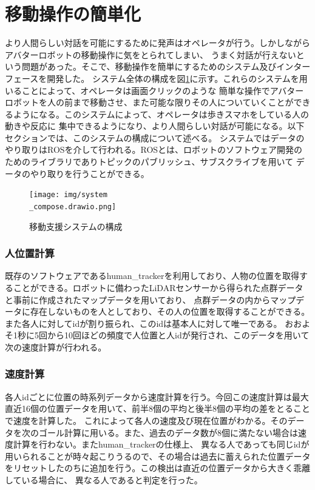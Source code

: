 \documentclass{kuisthesis}
\begin{document}
\section{移動操作の簡単化}
より人間らしい対話を可能にするために発声はオペレータが行う。しかしながらアバターロボットの移動操作に気をとられてしまい、
うまく対話が行えないという問題があった。そこで、移動操作を簡単にするためのシステム及びインターフェースを開発した。
システム全体の構成を図\ref{pic:systemcompose}に示す。これらのシステムを用いることによって、オペレータは画面クリックのような
簡単な操作でアバターロボットを人の前まで移動させ、また可能な限りその人についていくことができるようになる。このシステムによって、オペレータは歩きスマホをしている人の動きや反応に
集中できるようになり、より人間らしい対話が可能になる。以下セクションでは、このシステムの構成について述べる。
システムではデータのやり取りはROSを介して行われる。ROSとは、ロボットのソフトウェア開発のためのライブラリでありトピックのパブリッシュ、サブスクライブを用いて
データのやり取りを行うことができる。
\begin{figure}[H]
  
  \texttt{[image: img/system\\\_compose.drawio.png]}
  \caption{移動支援システムの構成}
  \label{pic:systemcompose}

\end{figure}


\subsubsection{人位置計算}
既存のソフトウェアであるhuman\_trackerを利用しており、人物の位置を取得することができる。ロボットに備わったLiDARセンサーから得られた点群データと事前に作成されたマップデータを用いており、
点群データの内からマップデータに存在しないものを人としており、その人の位置を取得することができる。また各人に対してidが割り振られ、このidは基本人に対して唯一である。
おおよそ1秒に5回から10回ほどの頻度で人位置と人idが発行され、このデータを用いて次の速度計算が行われる。

\subsubsection{速度計算}
各人idごとに位置の時系列データから速度計算を行う。今回この速度計算は最大直近16個の位置データを用いて、前半8個の平均と後半8個の平均の差をとることで速度を計算した。
これによって各人の速度及び現在位置がわかる。そのデータを次のゴール計算に用いる。また、過去のデータ数が8個に満たない場合は速度計算を行わない。またhuman\_trackerの仕様上、
異なる人であっても同じidが用いられることが時々起こりうるので、その場合は過去に蓄えられた位置データをリセットしたのちに追加を行う。この検出は直近の位置データから大きく乖離している場合に、
異なる人であると判定を行った。
\end{document}
